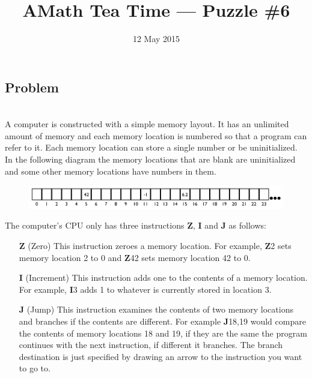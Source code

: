\documentclass[12pt]{article}
\title{AMath Tea Time --- Puzzle \#6}
\author{}
\date{\vspace{-1cm}12 May 2015}
\begin{document}
\maketitle
{}

\subsection*{Problem}

 \\

\noindent A computer is constructed with a simple memory layout. It has an
unlimited amount of memory and each memory location is numbered so that a
program can refer to it. Each memory location can store a single number or be
uninitialized. In the following diagram the memory locations that are blank are
uninitialized and some other memory locations have numbers in them.

\begin{figure}[ht]
  \centering
  \includegraphics[width=\textwidth]{zmachine.png}
\end{figure}

\noindent The computer's CPU only has three instructions {\bf Z}, {\bf I} and
{\bf J} as follows:

\begin{itemize}
  \item[{\bf Z}] (Zero) This instruction zeroes a memory location. For example,
    {\bf Z}2 sets memory location 2 to 0 and {\bf Z}42 sets memory location 42
    to 0.
  \item[{\bf I}] (Increment) This instruction adds one to the contents of a
    memory location. For example, {\bf I}3 adds 1 to whatever is currently
    stored in location 3.
  \item[{\bf J}] (Jump) This instruction examines the contents of two memory
    locations and branches if the contents are different. For example {\bf
      J}18,19 would compare the contents of memory locations 18 and 19, if they
    are the same the program continues with the next instruction, if different
    it branches. The branch destination is just specified by drawing an arrow
    to the instruction you want to go to.
\end{itemize}
\end{document}
